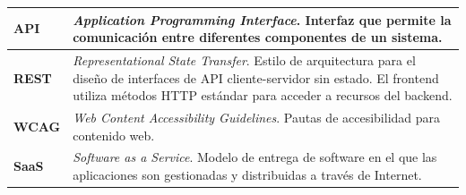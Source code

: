 \begin{longtable}[]{@{}
        p{}
        p{}@{}}
    \textbf{API} & \emph{Application Programming Interface}. Interfaz que permite la comunicación entre diferentes componentes de un sistema. \\
    \midrule

    \textbf{REST} & \emph{Representational State Transfer}. Estilo de arquitectura para el diseño de interfaces de API cliente-servidor sin estado. El frontend utiliza métodos HTTP estándar para acceder a recursos del backend. \\
    \midrule

    \textbf{WCAG} & \emph{Web Content Accessibility Guidelines}. Pautas de accesibilidad para contenido web. \\
    \midrule

    \textbf{SaaS} & \emph{Software as a Service}. Modelo de entrega de software en el que las aplicaciones son gestionadas y distribuidas a través de Internet. \\
    \midrule

\end{longtable}


\newpage


